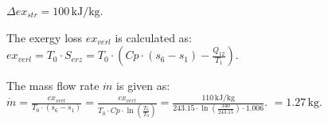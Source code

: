\( \Delta ex_{str} = 100 \, \text{kJ/kg} \).  

The exergy loss \( ex_{verl} \) is calculated as:  
\( ex_{verl} = T_0 \cdot S_{erz} = T_0 \cdot \left(Cp \cdot (s_6 - s_1) - \frac{Q_{12}}{T_1}\right) \).  

The mass flow rate \( \dot{m} \) is given as:  
\( \dot{m} = \frac{ex_{verl}}{T_0 \cdot (s_6 - s_1)} = \frac{ex_{verl}}{T_0 \cdot Cp \cdot \ln\left(\frac{T_6}{T_0}\right)} = \frac{110 \, \text{kJ/kg}}{243.15 \cdot \ln\left(\frac{340}{243.15}\right) \cdot 1.006} \).  
\( = 1.27 \, \text{kg} \).